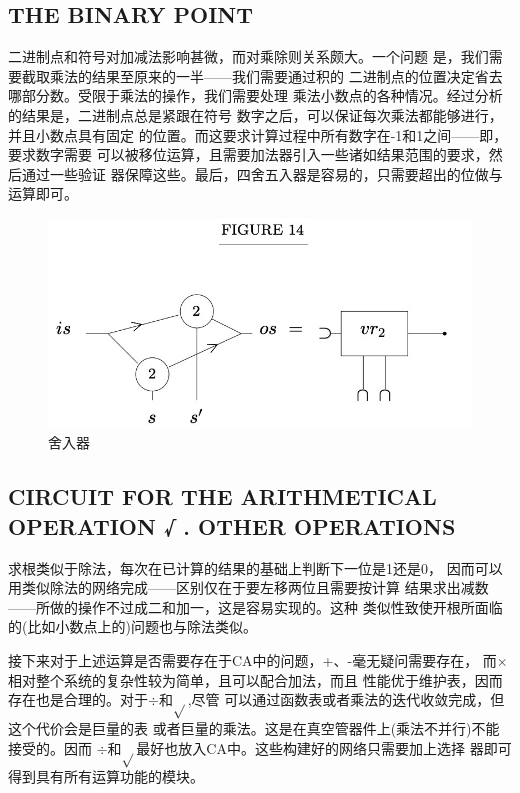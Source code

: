 \documentclass[UTF8]{ctexart}
\begin{document}
\subsection{THE BINARY POINT}

二进制点和符号对加减法影响甚微，而对乘除则关系颇大。一个问题
是，我们需要截取乘法的结果至原来的一半——我们需要通过积的
二进制点的位置决定省去哪部分数。受限于乘法的操作，我们需要处理
乘法小数点的各种情况。经过分析的结果是，二进制点总是紧跟在符号
数字之后，可以保证每次乘法都能够进行，并且小数点具有固定
的位置。而这要求计算过程中所有数字在-1和1之间——即，要求数字需要
可以被移位运算，且需要加法器引入一些诸如结果范围的要求，然后通过一些验证
器保障这些。最后，四舍五入器是容易的，只需要超出的位做与运算即可。

\begin{figure}[H]
\centering
\includegraphics[width=\textwidth]{./pics/13.jpeg}
\caption{舍入器}
\end{figure}

\subsection{CIRCUIT FOR THE ARITHMETICAL OPERATION √ . OTHER OPERATIONS}

求根类似于除法，每次在已计算的结果的基础上判断下一位是1还是0，
因而可以用类似除法的网络完成——区别仅在于要左移两位且需要按计算
结果求出减数——所做的操作不过成二和加一，这是容易实现的。这种
类似性致使开根所面临的(比如小数点上的)问题也与除法类似。

接下来对于上述运算是否需要存在于CA中的问题，+、-毫无疑问需要存在，
而$\times$相对整个系统的复杂性较为简单，且可以配合加法，而且
性能优于维护表，因而存在也是合理的。对于$\div$和$\sqrt{}$,尽管
可以通过函数表或者乘法的迭代收敛完成，但这个代价会是巨量的表
或者巨量的乘法。这是在真空管器件上(乘法不并行)不能接受的。因而
$\div$和$\sqrt{}$最好也放入CA中。这些构建好的网络只需要加上选择
器即可得到具有所有运算功能的模块。
\end{document}
